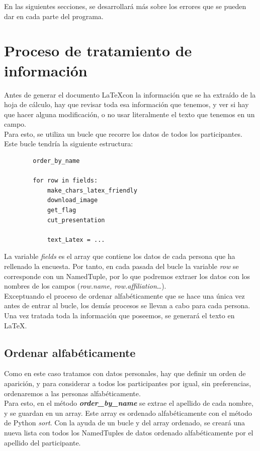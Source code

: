 \documentclass[a4paper, 12pt]{book}
\begin{document}
En las siguientes secciones, se desarrollará más sobre los errores que se pueden dar en cada parte del programa.

\section{Proceso de tratamiento de información}
\label{sec:tratainfo}
Antes de generar el documento \LaTeX con la información que se ha extraído de la hoja de cálculo, hay que revisar toda esa información que tenemos, y ver si hay que hacer alguna modificación, o no usar literalmente el texto que tenemos en un campo.\\

Para esto, se utiliza un bucle que recorre los datos de todos los participantes. Este bucle tendría la siguiente estructura:
\newpage
\begin{verbatim}
        order_by_name

        for row in fields:
            make_chars_latex_friendly
            download_image
            get_flag
            cut_presentation
    
            text_Latex = ...   
\end{verbatim}

La variable \textit{fields} es el array que contiene los datos de cada persona que ha rellenado la encuesta. Por tanto, en cada pasada del bucle la variable \textit{row} se corresponde con un NamedTuple, por lo que podremos extraer los datos con los nombres de los campos (\textit{row.name, row.affiliation}\ldots).\\

Exceptuando el proceso de ordenar alfabéticamente que se hace una única vez antes de entrar al bucle, los demás procesos se llevan a cabo para cada persona. Una vez tratada toda la información que poseemos, se generará el texto en \LaTeX.


\subsection{Ordenar alfabéticamente}
\label{subsec:orden}
Como en este caso tratamos con datos personales, hay que definir un orden de aparición, y para considerar a todos los participantes por igual, sin preferencias, ordenaremos a las personas alfabéticamente.\\

Para esto, en el método \textbf{\textit{order\_by\_name}} se extrae el apellido de cada nombre, y se guardan en un array. Este array es ordenado alfabéticamente con el método de Python \textit{sort}. Con la ayuda de un bucle y del array ordenado, se creará una nueva lista con todos los NamedTuples de datos ordenado alfabéticamente por el apellido del participante.
\end{document}
